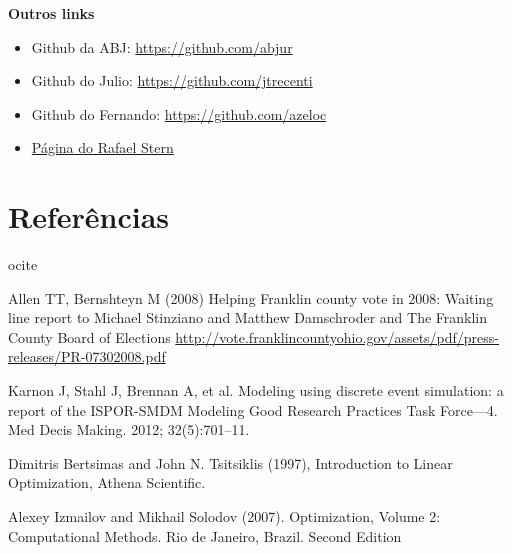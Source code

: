 \documentclass[]{book}
\providecommand{\tightlist}{%
  \setlength{\itemsep}{0pt}\setlength{\parskip}{0pt}}
\begin{document}
\textbf{Outros links}

\begin{itemize}
\tightlist
\item
  Github da ABJ: \url{https://github.com/abjur}
\item
  Github do Julio: \url{https://github.com/jtrecenti}
\item
  Github do Fernando: \url{https://github.com/azeloc}
\item
  \href{http://www.somos.ufscar.br/professores/view/3477}{Página do
  Rafael Stern}
\end{itemize}

\chapter{Referências}\label{referencias}

ocite

Allen TT, Bernshteyn M (2008) Helping Franklin county vote in 2008:
Waiting line report to Michael Stinziano and Matthew Damschroder and The
Franklin County Board of Elections
\url{http://vote.franklincountyohio.gov/assets/pdf/press-releases/PR-07302008.pdf}

Karnon J, Stahl J, Brennan A, et al. Modeling using discrete event
simulation: a report of the ISPOR-SMDM Modeling Good Research Practices
Task Force---4. Med Decis Making. 2012; 32(5):701--11.

Dimitris Bertsimas and John N. Tsitsiklis (1997), Introduction to Linear
Optimization, Athena Scientific.

Alexey Izmailov and Mikhail Solodov (2007). Optimization, Volume 2:
Computational Methods. Rio de Janeiro, Brazil. Second Edition


\end{document}
